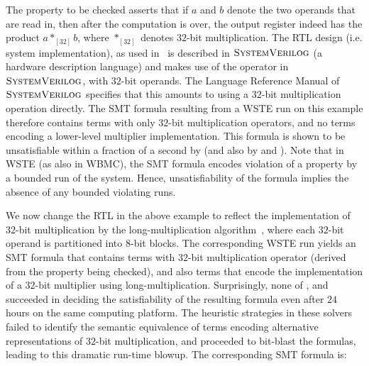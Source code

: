 The property to be checked asserts that if $a$ and $b$ denote the two
operands that are read in, then after the computation is over, the
output register indeed has the product $a *_{[32]} b$, where
$*_{[32]}$ denotes $32$-bit multiplication.  The RTL design
(i.e. system implementation), as used in~\cite{wste} is described in $\textsc{SystemVerilog}$
(a hardware description language) and makes use of the
{\tt *} operator in $\textsc{SystemVerilog}$, with $32$-bit operands.  The Language
Reference Manual of $\textsc{SystemVerilog}$ specifies that this amounts to using a
$32$-bit multiplication operation directly.  The SMT formula resulting
from a WSTE run on this example therefore contains terms with only
$32$-bit multiplication operators, and no terms encoding a lower-level
multiplier implementation.  This formula is shown to be unsatisfiable
within a fraction of a second by {\boolector} (and also by {\cvcfour}
and {\zthree}).  Note that in WSTE (as also in WBMC), the SMT formula
encodes violation of a property by a bounded run of the system. Hence,
unsatisfiability of the formula implies the absence of any bounded
violating runs.

We now change the RTL in the above example to reflect the
implementation of $32$-bit multiplication by the long-multiplication
algorithm~\cite{long}, where each $32$-bit operand is partitioned into
$8$-bit blocks.  The corresponding WSTE run yields an SMT formula that
contains terms with $32$-bit multiplication operator (derived from the
property being checked), and also terms that encode the implementation
of a $32$-bit multiplier using long-multiplication.  Surprisingly, none
of {\boolector}, {\cvcfour} and {\zthree} succeeded in deciding the
satisfiability of the resulting formula even after $24$ hours on the
same computing platform.  The heuristic strategies in these solvers
failed to identify the semantic equivalence of terms encoding
alternative representations of $32$-bit multiplication, and proceeded
to bit-blast the formulas, leading to this dramatic run-time blowup. The corresponding SMT formula is:


